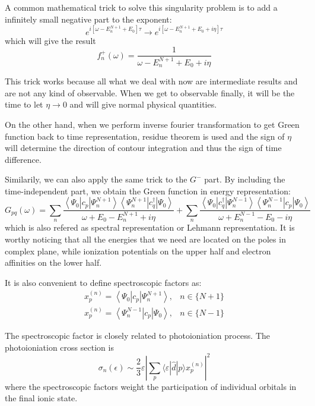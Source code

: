 \documentclass[bachelor, english]{ustcthesis}
\begin{document}
A common mathematical trick to solve this singularity problem is to add a infinitely small negative part to the exponent:
$$
e^{i\left[\omega-E_{n}^{N+1}+E_{0}\right] \tau} \rightarrow e^{i\left[\omega-E_{n}^{N+1}+E_{0}+i\eta\right] \tau}
$$
which will give the result
$$
f_{n}^{+}(\omega)=\frac{1}{\omega-E_{n}^{N+1}+E_{0}+i \eta}
$$

This trick works because all what we deal with now are intermediate results and are not any kind of observable.
When we get to observable finally, it will be the time to let $\eta \rightarrow 0$ and will give normal physical quantities.

On the other hand, when we perform inverse fourier transformation to get Green function back to time representation, residue theorem is used and the sign of $\eta$ will determine the direction of contour integration and thus the sign of time difference.

Similarily, we can also apply the same trick to the $G^{-}$ part.
By including the time-independent part, we obtain the Green function in energy representation:
$$
G_{p q}(\omega)=\sum_{n} \frac{\left\langle\Psi_{0}\left|c_{p}\right| \Psi_{n}^{N+1}\right\rangle\left\langle\Psi_{n}^{N+1}\left|c_{q}^{\dagger}\right| \Psi_{0}\right\rangle}{\omega+E_{0}-E_{n}^{N+1}+i \eta}+\sum_{n} \frac{\left\langle\Psi_{0}\left|c_{q}^{\dagger}\right| \Psi_{n}^{N-1}\right\rangle\left\langle\Psi_{n}^{N-1}\left|c_{p}\right| \Psi_{0}\right\rangle}{\omega+E_{n}^{N-1}-E_{0}-i \eta}
$$
which is also refered as spectral representation or Lehmann representation.
It is worthy noticing that all the energies that we need are located on the poles in complex plane, while ionization potentials on the upper half and electron affinities on the lower half.

It is also convenient to define spectroscopic factors as:
$$
\begin{array}{ll}{x_{p}^{(n)}=\left\langle\Psi_{0}\left|c_{p}\right| \Psi_{n}^{N+1}\right\rangle,} & { n \in\{N+1\}} \\ {x_{p}^{(n)}=\left\langle\Psi_{n}^{N-1}\left|c_{p}\right| \Psi_{0}\right\rangle,} & { n \in\{N-1\}}\end{array}
$$

The spectroscopic factor is closely related to photoioniation process.
The photoioniation cross section is
$$
\sigma_{n}(\epsilon) \sim \frac{2}{3} \varepsilon\left|\sum_{p}\langle\varepsilon|\hat{d}| p\rangle x_{p}^{(n)}\right|^{2}
$$
where the spectroscopic factors weight the participation of individual orbitals in the final ionic state.
\end{document}
